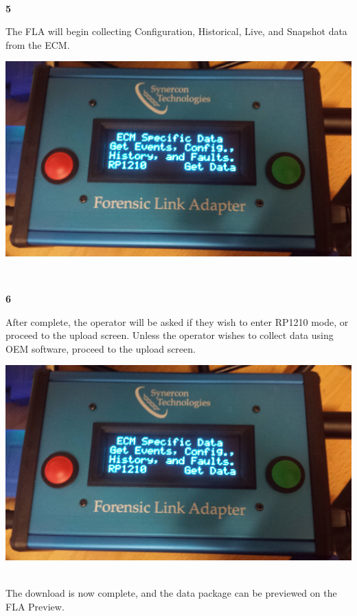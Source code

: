 \documentclass[11pt]{article}
\begin{document}
\\[\baselineskip]
\noindent\begin{minipage}{0.3\textwidth}%
\begin{center}
\textbf{5}\\[\baselineskip]
\end{center}
The FLA will begin collecting Configuration, Historical, Live, and Snapshot data from the ECM.
\end{minipage}%
\hfill%
\begin{minipage}{0.6\textwidth}
\includegraphics[width=\linewidth]{../../media/fla_screens/ecm_confirm}
\end{minipage}
\\[\baselineskip]
\noindent\begin{minipage}{0.3\textwidth}%
\begin{center}
\textbf{6}\\[\baselineskip]
\end{center}
After complete, the operator will be asked if they wish to enter RP1210 mode, or proceed to the upload screen. Unless the operator wishes to collect data using OEM software, proceed to the upload screen.
\end{minipage}%
\hfill%
\begin{minipage}{0.6\textwidth}
\includegraphics[width=\linewidth]{../../media/fla_screens/ecm_confirm}
\end{minipage}\\[\baselineskip]
The download is now complete, and the data package can be previewed on the FLA Preview.
\end{document}
